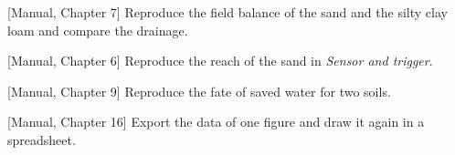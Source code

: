 \begin{exlist}
\item {\color{khblue}[Manual, Chapter 7]} Reproduce the field balance of the sand and the silty clay loam and compare the drainage.\par{}
\item {\color{khblue}[Manual, Chapter 6]} Reproduce the reach of the sand in \emph{Sensor and trigger}.\par{}
\item {\color{khblue}[Manual, Chapter 9]} Reproduce the fate of saved water for two soils.\par{}
\item {\color{khblue}[Manual, Chapter 16]} Export the data of one figure and draw it again in a spreadsheet.\par{}
\end{exlist}
